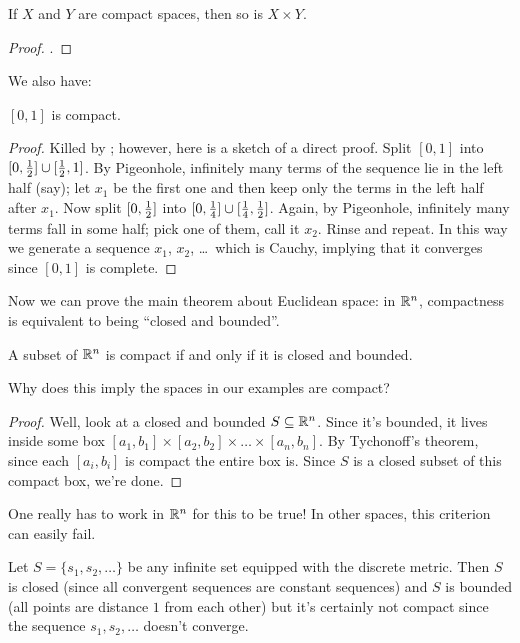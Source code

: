 \begin{theorem}
	\label{thm:tychonoff}
	If $X$ and $Y$ are compact spaces, then so is $X \times Y$.
\end{theorem}
\begin{proof}
	.
\end{proof}

We also have:
\begin{theorem}
	\label{thm:interval_compact}
	$[0,1]$ is compact.
\end{theorem}
\begin{proof}
	Killed by ;
	however, here is a sketch of a direct proof.
	Split $[0,1]$ into $[0,\frac{1}{2}] \cup [\frac{1}{2},1]$.
	By Pigeonhole, infinitely many terms of the sequence lie in the left half (say);
	let $x_1$ be the first one and then keep only the terms in the left half after $x_1$.
	Now split $[0, \frac{1}{2}]$ into $[0,\frac14] \cup [\frac14,\frac{1}{2}]$.
	Again, by Pigeonhole, infinitely many terms fall in some half; pick one of them, call it $x_2$.
	Rinse and repeat.
	In this way we generate a sequence $x_1$, $x_2$, \dots\ which is Cauchy,
	implying that it converges since $[0,1]$ is complete.
\end{proof}

Now we can prove the main theorem about Euclidean space:
in $\mathbb R^n$, compactness is equivalent to being ``closed and bounded''.
\begin{theorem}
	A subset of $\mathbb R^n$ is compact if and only if it is closed and bounded.
	\label{thm:fakeBW}
\end{theorem}
\begin{ques}
	Why does this imply the spaces in our examples are compact?
\end{ques}
\begin{proof}
	Well, look at a closed and bounded $S \subseteq \mathbb R^n$.
	Since it's bounded, it lives inside some box $[a_1, b_1] \times [a_2, b_2] \times \dots \times [a_n, b_n]$.
	By Tychonoff's theorem, since each $[a_i, b_i]$ is compact the entire box is.
	Since $S$ is a closed subset of this compact box, we're done.
\end{proof}

One really has to work in $\mathbb R^n$ for this to be true!
In other spaces, this criterion can easily fail.
\begin{example}
	Let $S = \{s_1, s_2, \dots\}$ be any infinite set equipped with the discrete metric.
	Then $S$ is closed (since all convergent sequences are constant sequences)
	and $S$ is bounded (all points are distance $1$ from each other)
	but it's certainly not compact since the sequence $s_1, s_2, \dots$ doesn't converge.
\end{example}

